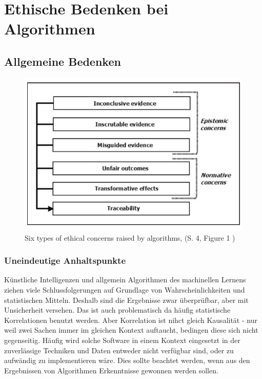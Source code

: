 \chapter{Ethische Bedenken bei Algorithmen}

\section{Allgemeine Bedenken}

\begin{figure}
  \includegraphics[width=\linewidth]{resources/ethical_concerns.png}
  \caption{Six types of ethical concerns raised by algorithms, (S. 4, Figure 1 )}
  \label{fig:Ethische Bedenken}
\end{figure}



\subsection{Uneindeutige Anhaltspunkte}
 Künstliche Intelligenzen und allgemein Algorithmen des machinellen Lernens ziehen viele Schlussfolgerungen auf Grundlage von Wahrscheinlichkeiten und statistischen Mitteln.
 Deshalb sind die Ergebnisse zwar überprüfbar, aber mit Unsicherheit versehen.
 Das ist auch problematisch da häufig statistische Korrelationen benutzt werden. Aber Korrelation ist nihct gleich Kausalität - nur weil zwei Sachen immer im gleichen Kontext auftaucht, bedingen diese sich nicht gegenseitig.
 Häufig wird solche Software in einem Kontext eingesetzt in der zuverlässige Techniken und Daten entweder nicht verfügbar sind, oder zu aufwändig zu implementieren wäre. Dies sollte beachtet werden, wenn aus den Ergebnissen von Algorithmen Erkenntnisse gewonnen werden sollen. 


